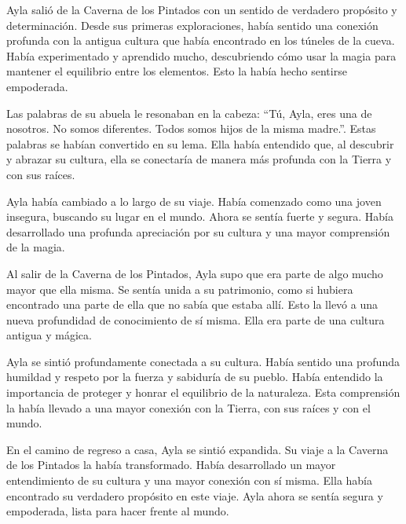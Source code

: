 

Ayla salió de la Caverna de los Pintados con un sentido de verdadero propósito y determinación. Desde sus primeras exploraciones, había sentido una conexión profunda con la antigua cultura que había encontrado en los túneles de la cueva. Había experimentado y aprendido mucho, descubriendo cómo usar la magia para mantener el equilibrio entre los elementos. Esto la había hecho sentirse empoderada. 

Las palabras de su abuela le resonaban en la cabeza: “Tú, Ayla, eres una de nosotros. No somos diferentes. Todos somos hijos de la misma madre.”. Estas palabras se habían convertido en su lema. Ella había entendido que, al descubrir y abrazar su cultura, ella se conectaría de manera más profunda con la Tierra y con sus raíces. 

Ayla había cambiado a lo largo de su viaje. Había comenzado como una joven insegura, buscando su lugar en el mundo. Ahora se sentía fuerte y segura. Había desarrollado una profunda apreciación por su cultura y una mayor comprensión de la magia. 

Al salir de la Caverna de los Pintados, Ayla supo que era parte de algo mucho mayor que ella misma. Se sentía unida a su patrimonio, como si hubiera encontrado una parte de ella que no sabía que estaba allí. Esto la llevó a una nueva profundidad de conocimiento de sí misma. Ella era parte de una cultura antigua y mágica. 

Ayla se sintió profundamente conectada a su cultura. Había sentido una profunda humildad y respeto por la fuerza y sabiduría de su pueblo. Había entendido la importancia de proteger y honrar el equilibrio de la naturaleza. Esta comprensión la había llevado a una mayor conexión con la Tierra, con sus raíces y con el mundo. 

En el camino de regreso a casa, Ayla se sintió expandida. Su viaje a la Caverna de los Pintados la había transformado. Había desarrollado un mayor entendimiento de su cultura y una mayor conexión con sí misma. Ella había encontrado su verdadero propósito en este viaje. Ayla ahora se sentía segura y empoderada, lista para hacer frente al mundo.